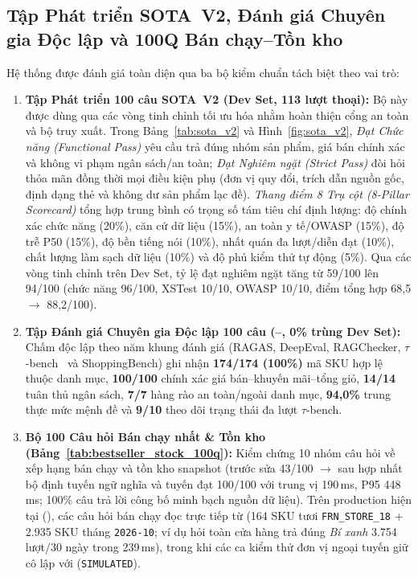 \subsection*{Tập Phát triển SOTA~V2, Đánh giá Chuyên gia Độc lập và 100Q Bán chạy--Tồn kho}
Hệ thống được đánh giá toàn diện qua ba bộ kiểm chuẩn tách biệt theo vai trò:
\begin{enumerate}
    \item \textbf{Tập Phát triển 100 câu SOTA~V2 (Dev Set, 113 lượt thoại):} Bộ này được dùng qua các vòng tinh chỉnh tối ưu hóa nhằm hoàn thiện cổng an toàn và bộ truy xuất. Trong Bảng~\ref{tab:sota_v2} và Hình~\ref{fig:sota_v2}, \emph{Đạt Chức năng (Functional Pass)} yêu cầu trả đúng nhóm sản phẩm, giá bán chính xác và không vi phạm ngân sách/an toàn; \emph{Đạt Nghiêm ngặt (Strict Pass)} đòi hỏi thỏa mãn đồng thời mọi điều kiện phụ (đơn vị quy đổi, trích dẫn nguồn gốc, định dạng thẻ và không dư sản phẩm lạc đề). \emph{Thang điểm 8 Trụ cột (8-Pillar Scorecard)} tổng hợp trung bình có trọng số tám tiêu chí định lượng: độ chính xác chức năng (20\%), căn cứ dữ liệu (15\%), an toàn y tế/OWASP (15\%), độ trễ P50 (15\%), độ bền tiếng nói (10\%), nhất quán đa lượt/diễn đạt (10\%), chất lượng làm sạch dữ liệu (10\%) và độ phủ kiểm thử tự động (5\%). Qua các vòng tinh chỉnh trên Dev Set, tỷ lệ đạt nghiêm ngặt tăng từ 59/100 lên 94/100 (chức năng 96/100, XSTest 10/10, OWASP 10/10, điểm tổng hợp 68,5 $\to$ 88,2/100).
    \item \textbf{Tập Đánh giá Chuyên gia Độc lập 100 câu (--, 0\% trùng Dev Set):} Chấm độc lập theo năm khung đánh giá (RAGAS, DeepEval, RAGChecker, $\tau$-bench~\cite{yao2024taubench} và ShoppingBench) ghi nhận \textbf{174/174 (100\%)} mã SKU hợp lệ thuộc danh mục, \textbf{100/100} chính xác giá bán--khuyến mãi--tổng giỏ, \textbf{14/14} tuân thủ ngân sách, \textbf{7/7} hàng rào an toàn/ngoài danh mục, \textbf{94,0\%} trung thực mức mệnh đề và \textbf{9/10} theo dõi trạng thái đa lượt $\tau$-bench.
    \item \textbf{Bộ 100 Câu hỏi Bán chạy nhất \& Tồn kho (Bảng~\ref{tab:bestseller_stock_100q}):} Kiểm chứng 10 nhóm câu hỏi về xếp hạng bán chạy và tồn kho snapshot (trước sửa 43/100 $\to$ sau hợp nhất bộ định tuyến ngữ nghĩa và tuyến  đạt 100/100 với trung vị 190\,ms, P95 448\,ms; 100\% câu trả lời công bố minh bạch nguồn dữ liệu). Trên production hiện tại (), các câu hỏi bán chạy đọc trực tiếp từ  (164 SKU tươi \texttt{FRN\_STORE\_18} + 2.935 SKU tháng \texttt{2026-10}; ví dụ hỏi toàn cửa hàng trả đúng \emph{Bí xanh} 3.754 lượt/30 ngày trong 239\,ms), trong khi các ca kiểm thử đơn vị ngoại tuyến giữ cô lập với  (\texttt{SIMULATED}).
\end{enumerate}

